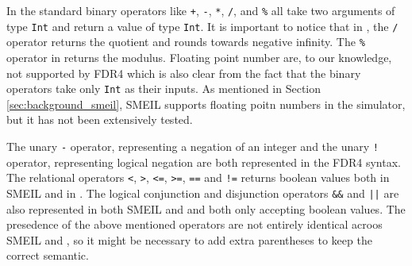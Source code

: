 In \cspm the standard binary operators like \texttt{+}, \texttt{-}, \texttt{*}, \texttt{/}, and \texttt{\%} all take two arguments of type \texttt{Int} and return a value of type \texttt{Int}. It is important to notice that in \cspm, the \texttt{/} operator returns the quotient and rounds towards negative infinity. The \texttt{\%} operator in \cspm returns the modulus.
Floating point number are, to our knowledge, not supported by FDR4\cite{Scattergood2011} which is also clear from the fact that the binary operators take only \texttt{Int} as their inputs.
As mentioned in Section \ref{sec:background_smeil}, SMEIL supports floating poitn numbers in the simulator, but it has not been extensively tested.

The unary \texttt{-} operator, representing a negation of an integer and the unary \texttt{!} operator, representing logical negation are both represented in the FDR4 syntax. The relational operators \texttt{<}, \texttt{>}, \texttt{<=}, \texttt{>=}, \texttt{==} and \texttt{!=} returns boolean values both in SMEIL and in \cspm. The logical conjunction and disjunction operators \texttt{\&\&} and \texttt{||} are also represented in both SMEIL and \cspm and both only accepting boolean values.
The presedence of the above mentioned operators are not entirely identical acroos SMEIL and \cspm, so it might be necessary to add extra parentheses to keep the correct semantic.



